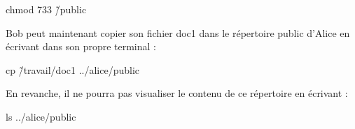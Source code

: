 \begin{tcolorbox}[lefttitle=2cm, colframe=gray!75!black, title=Terminal de commandes]
chmod 733 \~\slash public
\end{tcolorbox}

Bob peut maintenant copier son fichier doc1 dans le répertoire public d’Alice en écrivant dans son propre
terminal :


\begin{tcolorbox}[lefttitle=2cm, colframe=gray!75!black, title=Terminal de commandes]

cp \~\slash travail\slash doc1 ..\slash alice\slash public
\end{tcolorbox}
En revanche, il ne pourra pas visualiser le contenu de ce répertoire en écrivant :
\begin{tcolorbox}[lefttitle=2cm, colframe=gray!75!black, title=Terminal de commandes]
ls ..\slash alice\slash public
\end{tcolorbox}

